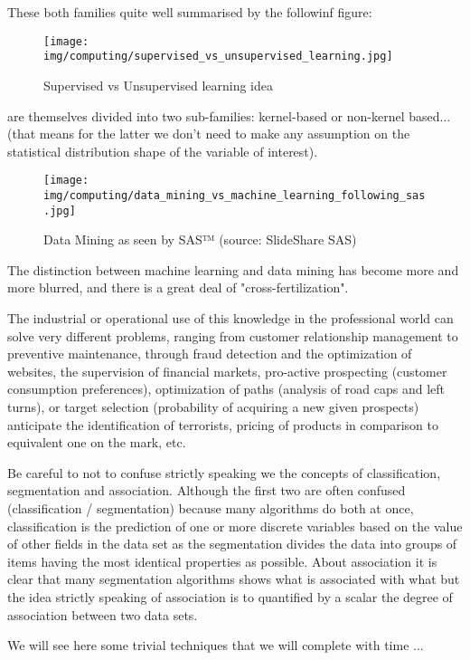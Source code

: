 	These both families  quite well summarised by the followinf figure:
	\begin{figure}[H]
		\centering
		\texttt{[image: img/computing/supervised\_vs\_unsupervised\_learning.jpg]}
		\caption{Supervised vs Unsupervised learning idea}
	\end{figure}
	are themselves divided into two sub-families: kernel-based or non-kernel based... (that means for the latter we don't need to make any assumption on the statistical distribution shape of the variable of interest).
	\begin{figure}[H]
		\centering
		\texttt{[image: img/computing/data\_mining\_vs\_machine\_learning\_following\_sas.jpg]}
		\caption{Data Mining as seen by SAS™ (source: SlideShare SAS)}
	\end{figure}
	The distinction between machine learning and data mining has become more and more blurred, and there is a great deal of "cross-fertilization".
	
	The industrial or operational use of this knowledge in the professional world can solve very different problems, ranging from customer relationship management to preventive maintenance, through fraud detection and the optimization of websites, the supervision of financial markets, pro-active prospecting (customer consumption preferences), optimization of paths (analysis of road caps and left turns), or target selection (probability of acquiring a new given prospects) anticipate the identification of terrorists, pricing of products in comparison to equivalent one on the mark, etc.
	
	\begin{tcolorbox}[title=Remark,colframe=black,arc=10pt]
	Be careful to not to confuse strictly speaking we the concepts of classification, segmentation and association. Although the first two are often confused (classification / segmentation) because many algorithms do both at once, classification is the prediction of one or more discrete variables based on the value of other fields in the data set as the segmentation divides the data into groups of items having the most identical properties as possible. About association it is clear that many segmentation algorithms shows what is associated with what but the idea strictly speaking of association is to quantified by a scalar the degree of association between two data sets.
	\end{tcolorbox}	
	We will see here some trivial techniques that we will complete with time ...
	
